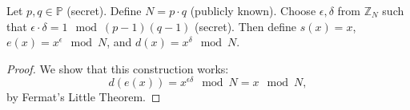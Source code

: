 \begin{example}
    Let $p, q \in \mathbb{P}$ (secret).
    Define $N = p \cdot q$ (publicly known).
    Choose $\epsilon, \delta$ from $\mathbb{Z}_N$ such that $\epsilon \cdot \delta = 1 \mod (p - 1)(q - 1)$ (secret).
    Then define $s(x) = x$, $e(x) = x^{\epsilon} \mod N$, and $d(x) = x^{\delta} \mod N$.
\end{example}

\begin{proof}
    We show that this construction works:
    \[
        d(e(x)) = x^{\epsilon \delta} \mod N = x \mod N,
    \]
    by Fermat's Little Theorem.
\end{proof}

